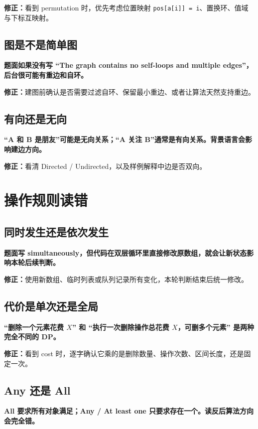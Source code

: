 \documentclass[UTF8,openany,oneside,zihao=-4]{ctexbook}
\newcommand{\risk}[1]{%
  \vspace{0.35em}
  \noindent\colorbox{softred}{%
    \parbox{\dimexpr\linewidth-2\fboxsep}{\textcolor{danger}{\textbf{#1}}}}%
  \vspace{0.35em}
}
\newcommand{\fix}[1]{%
  \vspace{0.35em}
  \noindent\colorbox{softgreen}{%
    \parbox{\dimexpr\linewidth-2\fboxsep}{\textbf{修正：}#1}}%
  \vspace{0.35em}
}
\begin{document}
\fix{看到 permutation 时，优先考虑位置映射 \texttt{pos[a[i]] = i}、置换环、值域与下标互映射。}

\subsection{图是不是简单图}

\risk{题面如果没有写 “The graph contains no self-loops and multiple edges”，后台很可能有重边和自环。}

\fix{建图前确认是否需要过滤自环、保留最小重边、或者让算法天然支持重边。}

\subsection{有向还是无向}

\risk{“A 和 B 是朋友”可能是无向关系；“A 关注 B”通常是有向关系。背景语言会影响建边方向。}

\fix{看清 Directed / Undirected，以及样例解释中边是否双向。}

\section{操作规则读错}

\subsection{同时发生还是依次发生}

\risk{题面写 simultaneously，但代码在双层循环里直接修改原数组，就会让新状态影响本轮后续判断。}

\fix{使用新数组、临时列表或队列记录所有变化，本轮判断结束后统一修改。}

\subsection{代价是单次还是全局}

\risk{“删除一个元素花费 $X$” 和 “执行一次删除操作总花费 $X$，可删多个元素” 是两种完全不同的 DP。}

\fix{看到 cost 时，逐字确认它乘的是删除数量、操作次数、区间长度，还是固定一次。}

\subsection{Any 还是 All}

\risk{All 要求所有对象满足；Any / At least one 只要求存在一个。读反后算法方向会完全错。}
\end{document}
